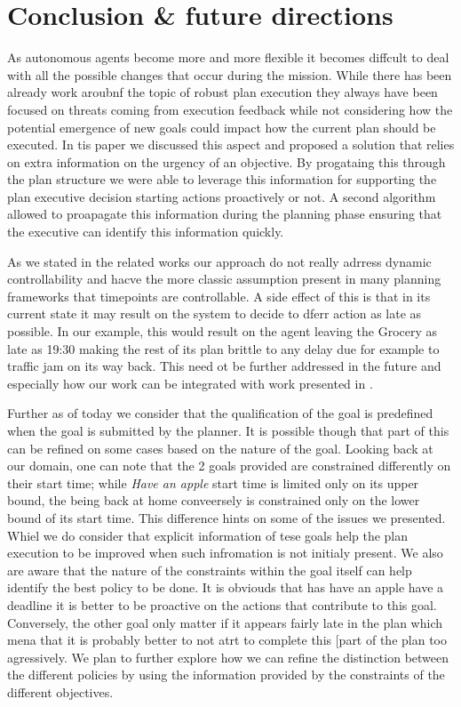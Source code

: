 
\section{Conclusion \& future directions}
\label{sec:conclude}



As autonomous agents become more and more flexible it becomes diffcult to deal with all the possible changes that occur during the mission. While there has been already work aroubnf the topic of robust plan execution they always have been focused on threats coming from execution feedback while not considering how the potential emergence 
of new goals could impact how the current plan should be executed. In tis paper we discussed this aspect and proposed a solution that relies on extra information on the urgency of an objective. By progataing this through the plan structure we were able to 
leverage this information for supporting the plan executive decision starting actions proactively or not. A second algorithm allowed to proapagate this information during the planning phase ensuring that the executive can identify this information quickly. 

As we stated in the related works our approach do not really adrress dynamic 
controllability and hacve the more classic assumption present in many planning 
frameworks that timepoints are controllable. A side effect of this is that in its current state it may result on the system to decide to dferr action as late as possible. In our example, this would result on the agent leaving the Grocery as late as 19:30 making the rest of its plan brittle to any delay due for example to traffic jam on its way back. This need ot be further addressed in the future and especially how our work can be integrated with work presented in \cite{morris01}. 

Further as of today we consider that the qualification of the goal is predefined when the goal is submitted by the planner. It is possible though that part of this can be refined on some cases based on the nature  of the goal. Looking back at our domain, one can note that the 2 goals provided are constrained differently on their start time; while {\em Have an  apple} start time is limited only on its upper bound, the being back at home conveersely is constrained only on the lower bound of its start time. This difference hints on some of the issues we presented. Whiel we do consider that explicit information of tese goals help the plan execution to be improved when such infromation is not initialy present. We also are aware that the nature of the constraints within the goal itself can help identify the best policy to be done. It is obviouds that has have an apple have a deadline it is better to be proactive on the actions that contribute to this goal. Conversely, the other goal only matter if it appears fairly late in the plan which mena that it is probably better to not atrt to complete this [part of the plan too agressively. We plan to further explore how we can refine the distinction between the different policies by using the information provided by the constraints of the different objectives. 
 
